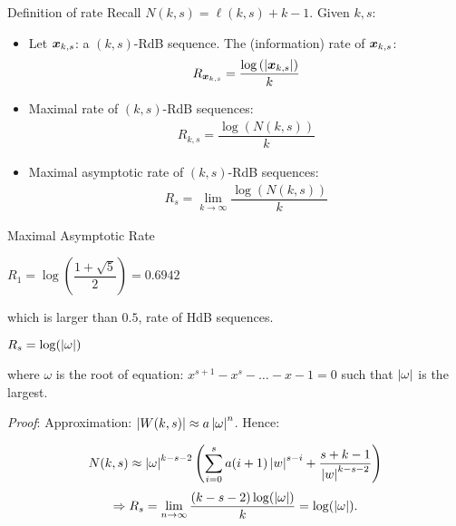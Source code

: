 \begin{frame}{Definition of rate}
    Recall $N(k,s) = \ell(k,s)+k-1$. Given $k,s$:
    \begin{itemize}
        \item Let ${\boldsymbol x}_{k,s}$: a $(k,s)$-RdB sequence. The (information) rate of ${\boldsymbol x}_{k,s}$:
        \begin{align}
            R_{{\boldsymbol x}_{k,s}} = \dfrac{\log\left(\left \lvert {\boldsymbol x}_{k,s} \right \rvert\right)}{k}
        \end{align}
        \pause
        \item Maximal rate of $(k,s)$-RdB sequences:
        \begin{align}
            R_{k,s} = \dfrac{\log(N(k,s))}{k}
        \end{align}
        \pause
        \item  Maximal asymptotic rate of $(k,s)$-RdB sequences:
        \begin{align}
            R_{s} = \lim_{k\to\infty}\dfrac{\log(N(k,s))}{k}
        \end{align}
    \end{itemize}
\end{frame}

\begin{frame}{Maximal Asymptotic Rate}
    \begin{theorem}
        \centering $R_{1}= \log\left(\dfrac{1+\sqrt{5}}{2}\right)=0.6942$
    \end{theorem}
    which is larger than $0.5$, rate of HdB sequences.
    \begin{theorem}
        \begin{center}
            $R_{s} = \log(\left \lvert \omega \right \rvert)$
        \end{center} 
        
        where $\omega$ is the root of equation: $x^{s+1}-x^{s}-\ldots-x-1=0$ such that $\left \lvert \omega \right \rvert$ is the largest.
    \end{theorem}
    \textit{Proof}: Approximation: $\left \lvert W(k,s) \right \rvert\approx a\left \lvert \omega \right \rvert^{n}$. Hence: 
    \begin{overprint}
    $$N(k,s)\approx \left \lvert \omega \right \rvert^{k-s-2}\left(\sum_{i=0}^{s}a(i+1)\left \lvert w \right \rvert^{s-i}+\dfrac{s+k-1}{\left \lvert w \right \rvert^{k-s-2}}\right)$$
    \[\Rightarrow R_{s} = \lim_{n\to\infty}\dfrac{(k-s-2)\log(\left \lvert \omega \right \rvert)}{k} = \log(\left \lvert \omega \right \rvert).\]
    \end{overprint}
    
\end{frame}